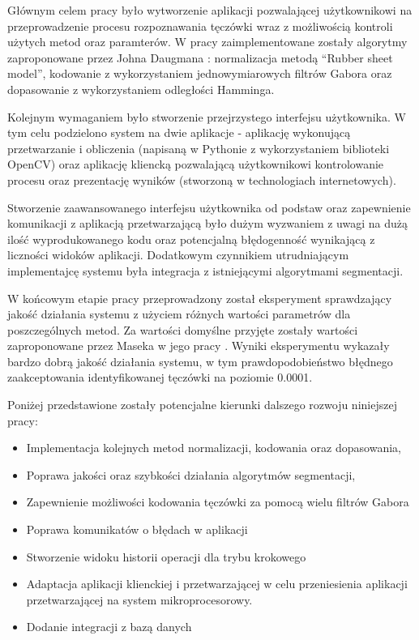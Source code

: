 \documentclass[10pt,polish,a4paper,oneside]{ppfcmthesis}
\begin{document}
Głównym celem pracy było wytworzenie aplikacji pozwalającej użytkownikowi na przeprowadzenie
procesu rozpoznawania tęczówki wraz z możliwością kontroli użytych metod oraz paramterów. W pracy
zaimplementowane zostały algorytmy zaproponowane przez Johna Daugmana \cite{DaugmanHowIrisRecognitionWorks}:
normalizacja metodą ``Rubber sheet model'', kodowanie z wykorzystaniem jednowymiarowych filtrów
Gabora oraz dopasowanie z wykorzystaniem odległości Hamminga.\newline

Kolejnym wymaganiem było stworzenie przejrzystego interfejsu użytkownika. W tym celu podzielono
system na dwie aplikacje - aplikację wykonującą przetwarzanie i obliczenia (napisaną w Pythonie z
wykorzystaniem biblioteki OpenCV) oraz aplikację kliencką pozwalającą użytkownikowi kontrolowanie
procesu oraz prezentację wyników (stworzoną w technologiach internetowych).\newline

Stworzenie zaawansowanego interfejsu użytkownika od podstaw oraz zapewnienie komunikacji z aplikacją
przetwarzającą było dużym wyzwaniem z uwagi na dużą iloś\'c wyprodukowanego kodu oraz potencjalną
błędogennoś\'c wynikającą z liczności widoków aplikacji. Dodatkowym czynnikiem utrudniającym
implementajcę systemu była integracja z istniejącymi algorytmami segmentacji.\newline

W końcowym etapie pracy przeprowadzony został eksperyment sprawdzający jakoś\'c działania
systemu z użyciem różnych wartości parametrów dla poszczególnych metod. Za wartości domyślne
przyjęte zostały wartości zaproponowane przez Maseka w jego pracy \cite{masek}. Wyniki
eksperymentu wykazały bardzo dobrą jakoś\'c działania systemu, w tym prawdopodobieństwo
błędnego zaakceptowania identyfikowanej tęczówki na poziomie 0.0001.\newline

\noindent
Poniżej przedstawione zostały potencjalne kierunki dalszego rozwoju niniejszej pracy:

\begin{itemize}
  \item Implementacja kolejnych metod normalizacji, kodowania oraz dopasowania,
  \item Poprawa jakości oraz szybkości działania algorytmów segmentacji,
  \item Zapewnienie możliwości kodowania tęczówki za pomocą wielu filtrów Gabora
  \item Poprawa komunikatów o błędach w aplikacji
  \item Stworzenie widoku historii operacji dla trybu krokowego
  \item Adaptacja aplikacji klienckiej i przetwarzającej w celu przeniesienia
  aplikacji przetwarzającej na system mikroprocesorowy.
  \item Dodanie integracji z bazą danych
\end{itemize}
 
\end{document}
